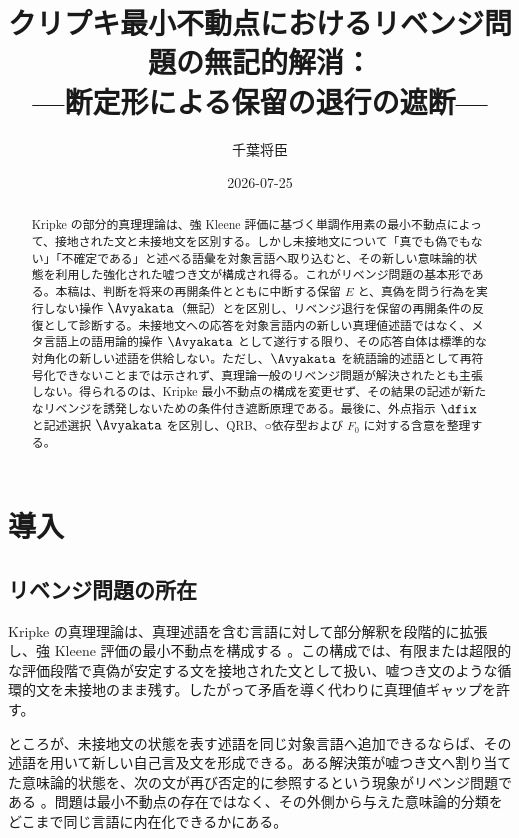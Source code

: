 \documentclass[11pt,a4paper]{article}
\title{クリプキ最小不動点におけるリベンジ問題の無記的解消：\\
---断定形による保留の退行の遮断---}
\author{千葉将臣}
\date{2026-07-25}
\theoremstyle{definition}
\theoremstyle{definition}
\newcommand{\Epoch}{E}
\begin{document}
\maketitle

\begin{abstract}
Kripke の部分的真理理論は、強 Kleene 評価に基づく単調作用素の最小不動点によって、接地された文と未接地文を区別する。しかし未接地文について「真でも偽でもない」「不確定である」と述べる語彙を対象言語へ取り込むと、その新しい意味論的状態を利用した強化された嘘つき文が構成され得る。これがリベンジ問題の基本形である。本稿は、判断を将来の再開条件とともに中断する保留 $\Epoch$ と、真偽を問う行為を実行しない操作 $\Avyakata$（無記）とを区別し、リベンジ退行を保留の再開条件の反復として診断する。未接地文への応答を対象言語内の新しい真理値述語ではなく、メタ言語上の語用論的操作 $\Avyakata$ として遂行する限り、その応答自体は標準的な対角化の新しい述語を供給しない。ただし、$\Avyakata$ を統語論的述語として再符号化できないことまでは示されず、真理論一般のリベンジ問題が解決されたとも主張しない。得られるのは、Kripke 最小不動点の構成を変更せず、その結果の記述が新たなリベンジを誘発しないための条件付き遮断原理である。最後に、外点指示 $\dfix$ と記述選択 $\Avyakata$ を区別し、QRB、○依存型および $F_0$ に対する含意を整理する。
\end{abstract}

\tableofcontents

\section{導入}

\subsection{リベンジ問題の所在}

Kripke の真理理論は、真理述語を含む言語に対して部分解釈を段階的に拡張し、強 Kleene 評価の最小不動点を構成する \cite{kripke}。この構成では、有限または超限的な評価段階で真偽が安定する文を接地された文として扱い、嘘つき文のような循環的文を未接地のまま残す。したがって矛盾を導く代わりに真理値ギャップを許す。

ところが、未接地文の状態を表す述語を同じ対象言語へ追加できるならば、その述語を用いて新しい自己言及文を形成できる。ある解決策が嘘つき文へ割り当てた意味論的状態を、次の文が再び否定的に参照するという現象がリベンジ問題である \cite{Beall2007}。問題は最小不動点の存在ではなく、その外側から与えた意味論的分類をどこまで同じ言語に内在化できるかにある。
\end{document}
